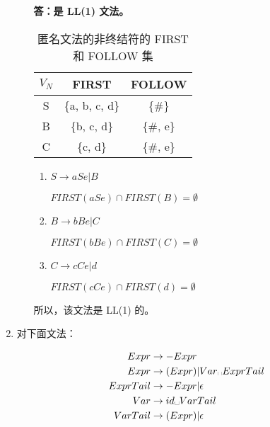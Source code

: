 \begin{enumerate}
\begin{enumerate}
        \textbf{答：是 LL(1) 文法。}
        
        \begin{table}[H]
            \centering
            \begin{tabular}{|c|c|c|}
                \hline
                $V_N$ & FIRST & FOLLOW \\
                \hline
                S & \{a, b, c, d\} & \{\#\} \\
                \hline
                B & \{b, c, d\} & \{\#, e\} \\
                \hline
                C & \{c, d\} & \{\#, e\} \\
                \hline
            \end{tabular}
            \caption{匿名文法的非终结符的 FIRST 和 FOLLOW 集}
            \label{tab:FF3_4}
        \end{table}
        
        \begin{enumerate}
            \item $S \to aSe | B$
            
            $FIRST(aSe) \cap FIRST(B) = \emptyset$
            
            \item $B \to bBe | C$
            
            $FIRST(bBe) \cap FIRST(C) = \emptyset$
            
            \item $C \to cCe | d$
            
            $FIRST(cCe) \cap FIRST(d) = \emptyset$
            
        \end{enumerate}
        
        所以，该文法是 LL(1) 的。
        
    \end{enumerate}
    
    \item 对下面文法：
    
    \begin{align*}
        Expr & \to -Expr \\
        Expr & \to (Expr) | Var \text{\textvisiblespace} ExprTail \\
        ExprTail & \to -Expr | \epsilon \\
        Var & \to id \text{\textvisiblespace} VarTail \\
        VarTail & \to (Expr) | \epsilon
    \end{align*}
    

\end{enumerate}
